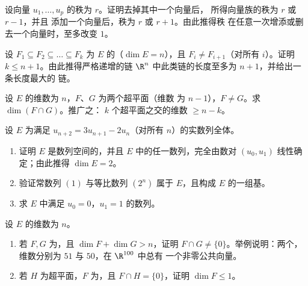 \begin{exercise}[$\star\star$]\label{exo:b1:findim:7}
设向量 $u_1, \dots, u_p$ 的秩为 $r$。证明去掉其中一个向量后，
所得向量族的秩为 $r$ 或 $r - 1$，并且
添加一个向量后，秩为 $r$ 或 $r + 1$。由此推得秩
在任意一次增添或删去一个向量时，至多改变 $1$。
\end{exercise}

\begin{exercise}[$\star\star\star$]\label{exo:b1:findim:8}
设 $F_1 \subseteq F_2 \subseteq \dots \subseteq F_k$ 为
$E$ 的（$\dim E = n$），且 $F_i \neq F_{i+1}$（对所有 $i$）。证明 $k
\leq n + 1$。由此推得严格递增的链
$\R^n$ 中此类链的长度至多为 $n + 1$，并给出一条长度最大的
链。
\end{exercise}

\begin{exercise}[$\star\star\star$]\label{exo:b1:findim:9}
设 $E$ 的维数为 $n$，$F$、$G$ 为两个超平面（维数
为 $n - 1$），$F \neq G$。求 $\dim(F \cap G)$。推广之：
$k$ 个超平面之交的维数 $\geq n - k$。
\end{exercise}

\begin{exercise}[$\star\star$]\label{exo:b1:findim:10}
设 $E$ 为满足 $u_{n+2} =
3u_{n+1} - 2u_n$（对所有 $n$）的实数列全体。
\begin{enumerate}
  \item 证明 $E$ 是数列空间的，并且
        $E$ 中的任一数列，完全由数对
        $(u_0, u_1)$ 线性确定；由此推得 $\dim E = 2$。
  \item 验证常数列 $(1)$ 与等比数列
        $(2^n)$ 属于 $E$，且构成 $E$ 的一组基。
  \item 求 $E$ 中满足 $u_0 = 0$，$u_1 = 1$ 的数列。
\end{enumerate}
\end{exercise}

\begin{exercise}[$\star\star$]\label{exo:b1:findim:11}
设 $E$ 的维数为 $n$。
\begin{enumerate}
  \item 若 $F, G$ 为，且 $\dim F + \dim G > n$，证明
        $F \cap G \neq \{0\}$。举例说明：两个，
        维数分别为 $51$ 与 $50$，在 $\R^{100}$ 中总有
        一个非零公共向量。
  \item 若 $H$ 为超平面，$F$ 为，且 $F \cap H =
        \{0\}$，证明 $\dim F \leq 1$。
\end{enumerate}
\end{exercise}

